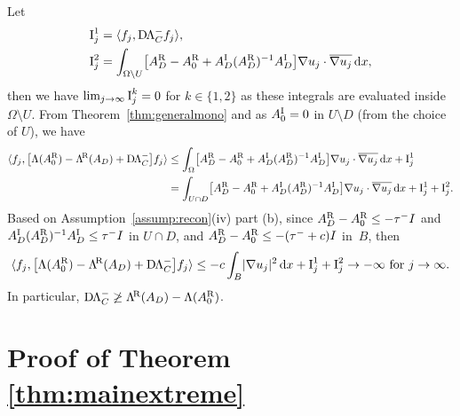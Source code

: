 \documentclass[reqno]{amsart}
\numberwithin{equation}{section}
\numberwithin{figure}{section}
\numberwithin{table}{section}
\theoremstyle{plain}
\theoremstyle{definition}
\theoremstyle{remark}
\newcommand{\abs}[1]{\lvert#1\rvert}
\newcommand{\inner}[1]{\langle#1\rangle}
\newcommand{\di}{\mathrm{d}}   %
\newcommand{\upR}{^{\textup{R}}}
\newcommand{\upI}{^{\textup{I}}}
\newcommand{\uptR}{^{\!\textup{R}}}
\newcommand{\LambdaR}{\Lambda\uptR}
\newcommand{\AR}{A\upR}
\newcommand{\AI}{A\upI}
\newcommand{\DLambda}{\textup{D}\mkern-1.5mu \Lambda}
\begin{document}
	Let 
	\begin{align*}
		\textup{I}^1_j &= \inner{f_j,\DLambda_C^- f_j}, \\
		\textup{I}^2_j &= \int_{\Omega\setminus U} \bigl[\AR_D-\AR_0 + \AI_D(\AR_D)^{-1}\AI_D \bigr]\nabla u_j\cdot\overline{\nabla u_j}\,\di x, 
	\end{align*}
	then we have $\lim_{j\to\infty} \textup{I}_j^k = 0$ for $k\in\{1,2\}$ as these integrals are evaluated inside $\Omega\setminus U$. From Theorem~\ref{thm:generalmono} and as $\AI_0 = 0$ in $U\setminus D$ (from the choice of $U$), we have
	\begin{align*}
		\inner{f_j,\bigl[ \Lambda(\AR_0)-\LambdaR(A_D)+\DLambda_C^- \bigr]f_j} &\leq \int_\Omega \bigl[\AR_D-\AR_0 + \AI_D(\AR_D)^{-1}\AI_D \bigr]\nabla u_j\cdot\overline{\nabla u_j}\,\di x + \textup{I}_j^1 \\
		&= \int_{U\cap D} \bigl[\AR_D-\AR_0 + \AI_D(\AR_D)^{-1}\AI_D \bigr]\nabla u_j\cdot\overline{\nabla u_j}\,\di x  + \textup{I}_j^1 + \textup{I}_j^2.
	\end{align*}
	Based on Assumption~\ref{assump:recon}(iv) part (b), since $\AR_D - \AR_0 \leq -\tau^- I$ and $\AI_D(\AR_D)^{-1}\AI_D \leq \tau^- I$ in $U\cap D$, and $\AR_D - \AR_0 \leq -(\tau^- + c) I$ in~$B$, then 
	\begin{equation*}
		\inner{f_j,\bigl[ \Lambda(\AR_0)-\LambdaR(A_D)+\DLambda_C^- \bigr]f_j} \leq -c\int_B \abs{\nabla u_j}^2\,\di x + \textup{I}_j^1 + \textup{I}_j^2 \to -\infty \text{ for } j\to\infty.
	\end{equation*}
	In particular, $\DLambda_C^- \not \geq \LambdaR(A_D) - \Lambda(\AR_0)$.
	
	
	\section{Proof of Theorem \ref{thm:mainextreme}} \label{sec:proofmainextreme}
	
\end{document}
